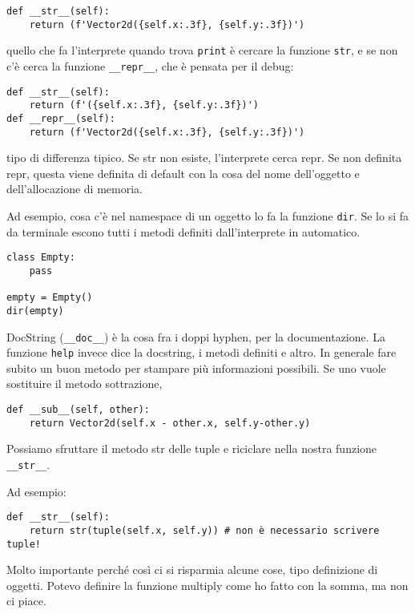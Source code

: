 \documentclass[10pt, a4paper, titlepage]{book}
\begin{document}
\begin{verbatim}
def __str__(self):
	return (f'Vector2d({self.x:.3f}, {self.y:.3f})')
\end{verbatim}

quello che fa l'interprete quando trova \texttt{print} è cercare la funzione \texttt{str}, e se non c'è cerca la funzione \texttt{__repr__}, che è pensata per il debug:

\begin{verbatim}
def __str__(self):
	return (f'({self.x:.3f}, {self.y:.3f})')
def __repr__(self):
	return (f'Vector2d({self.x:.3f}, {self.y:.3f})')
\end{verbatim}

tipo di differenza tipico.
Se str non esiste, l'interprete cerca repr. Se non definita repr, questa viene definita di default con la cosa del nome dell'oggetto e dell'allocazione di memoria.

Ad esempio, cosa c'è nel namespace di un oggetto lo fa la funzione \texttt{dir}. Se lo si fa da terminale escono tutti i metodi definiti dall'interprete in automatico.

\begin{verbatim}
class Empty:
	pass

empty = Empty()
dir(empty)
\end{verbatim}

DocString (\texttt{__doc__}) è la cosa fra i doppi hyphen, per la documentazione.
La funzione \texttt{help} invece dice la docstring, i metodi definiti e altro.
In generale fare subito un buon metodo per stampare più informazioni possibili.
Se uno vuole sostituire il metodo sottrazione, 

\begin{verbatim}
def __sub__(self, other):
	return Vector2d(self.x - other.x, self.y-other.y)
\end{verbatim}


Possiamo sfruttare il metodo str delle tuple e riciclare nella nostra funzione \texttt{__str__}.

Ad esempio:
\begin{verbatim}
def __str__(self):
	return str(tuple(self.x, self.y)) # non è necessario scrivere tuple!	
\end{verbatim}

Molto importante perché così ci si risparmia alcune cose, tipo definizione di oggetti. Potevo definire la funzione multiply come ho fatto con la somma, ma non ci piace.
\end{document}
